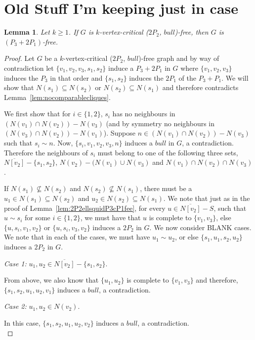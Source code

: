 \documentclass[11pt]{article}
\newtheorem{lemma}[theorem]{Lemma}
\theoremstyle{definition}
\begin{document}
\section{Old Stuff I'm keeping just in case}



\begin{lemma}\label{lem:2P2bullP32P1fee}
Let $k\ge 1$. If $G$ is $k$-vertex-critical ($2P_2$, $bull$)-free, then $G$ is $(P_3+2 P_1)$-free.
\end{lemma}
\begin{proof}
Let $G$ be a $k$-vertex-critical ($2P_2$, $bull$)-free graph and by way of contradiction let $\{v_1,v_2,v_3,s_1,s_2\}$ induce a $P_3+2P_1$ in $G$ where $\{v_1,v_2,v_3\}$ induces the $P_3$ in that order and $\{s_1,s_2\}$ induces the $2P_1$ of the $P_3+P_1$. We will show that $N(s_1)\subseteq N(s_2)$ or $N(s_2)\subseteq N(s_1)$ and therefore contradicts Lemma~\ref{lem:nocomparablecliques}.

We first show that for $i\in\{1,2\}$, $s_i$ has no neighbours in $(N(v_1)\cap N(v_2))-N(v_3)$  (and by symmetry no neighbours in $(N(v_3)\cap N(v_2))-N(v_1)$). Suppose $n\in (N(v_1)\cap N(v_2))-N(v_3)$ such that $s_i\sim n$. Now, $\{s_i,v_1,v_2,v_3,n\}$ induces a $bull$ in $G$, a contradiction. Therefore the neighbours of $s_i$ must belong to one of the following three sets, $\overline{N[v_2]}-\{s_1,s_2\}$, $N(v_2)-(N(v_1)\cup N(v_3)$ and $N(v_1)\cap N(v_2)\cap N(v_3)$. 

If $N(s_1)\not\subseteq N(s_2)$ and $N(s_2)\not\subseteq N(s_1)$, there must be a $u_1\in N(s_1)\subseteq N(s_2)$ and $u_2\in N(s_2)\subseteq N(s_1)$. We note that just as in the proof of Lemma~\ref{lem:2P2ellsquidP3cP1fee}, for every $u\in \overline{N[v_2]}-S$, such that $u\sim s_i$ for some $i\in \{1,2\}$, we must have that $u$ is complete to $\{v_1,v_3\}$, else $\{u,s_i,v_1,v_2\}$ or $\{u,s_i,v_3,v_2\}$ induces a $2P_2$ in $G$. We now consider BLANK cases. We note that in each of the cases, we must have $u_1\sim u_2$, or else $\{s_1,u_1,s_2,u_2\}$ induces a $2P_2$ in $G$.

\noindent \textit{Case 1:} $u_1,u_2\in \overline{N[v_2]}-\{s_1,s_2\}$.

From above, we also know that $\{u_1,u_2\}$ is complete to $\{v_1,v_3\}$ and therefore, $\{s_1,s_2,u_1,u_2,v_1\}$ induces a $bull$, a contradiction.

\noindent \textit{Case 2:} $u_1,u_2\in N(v_2)$.

In this case, $\{s_1,s_2,u_1,u_2,v_2\}$ induces a $bull$, a contradiction.\\


\end{proof}
\end{document}
